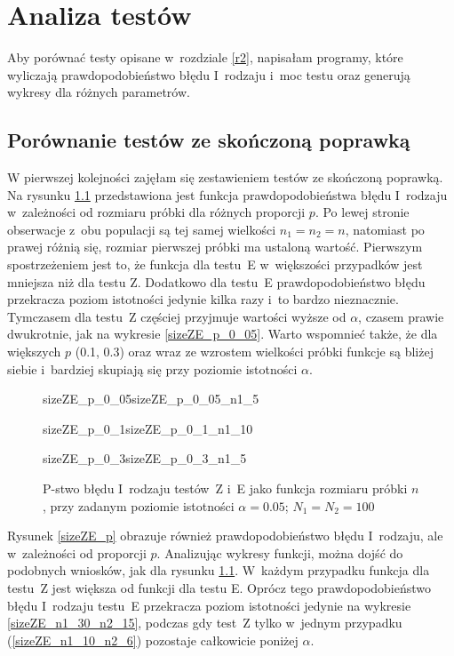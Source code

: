 \chapter{Analiza testów}
\label{r3}

Aby porównać testy opisane w~rozdziale \ref{r2}, napisałam programy, które wyliczają prawdopodobieństwo błędu I~rodzaju i~moc testu oraz generują wykresy dla różnych parametrów.

\section{Porównanie testów ze skończoną poprawką}
W pierwszej kolejności zajęłam się zestawieniem testów ze skończoną poprawką. Na rysunku \ref{sizeZE_n} przedstawiona jest funkcja prawdopodobieństwa błędu I~rodzaju w~zależności od rozmiaru próbki dla różnych proporcji $p$. Po lewej stronie obserwacje z~obu populacji są tej samej wielkości $n_1=n_2=n$, natomiast po prawej różnią się, rozmiar pierwszej próbki ma ustaloną wartość. Pierwszym spostrzeżeniem jest to, że funkcja dla testu~E w~większości przypadków jest mniejsza niż dla testu Z. Dodatkowo dla testu~E prawdopodobieństwo błędu przekracza poziom istotności jedynie kilka razy i~to bardzo nieznacznie. Tymczasem dla testu~Z częściej przyjmuje wartości wyższe od $\alpha$, czasem prawie dwukrotnie, jak na wykresie \ref{sizeZE_p_0_05}. Warto wspomnieć także, że dla większych $p$ (0.1, 0.3) oraz wraz ze wzrostem wielkości próbki funkcje są bliżej siebie i~bardziej skupiają się przy poziomie istotności $\alpha$.

\begin{figure}[!h]
	\begin{subdiagrams}{sizeZE_p_0_05}{sizeZE_p_0_05_n1_5}
	\end{subdiagrams}
	
	\begin{subdiagrams}{sizeZE_p_0_1}{sizeZE_p_0_1_n1_10}
	\end{subdiagrams}
	
	\begin{subdiagrams}{sizeZE_p_0_3}{sizeZE_p_0_3_n1_5}
	\end{subdiagrams}
	\caption{P-stwo błędu I~rodzaju testów~Z i~E jako funkcja rozmiaru próbki $n$, przy zadanym poziomie istotności $\alpha=0.05$; $N_1=N_2=100$}
	\label{sizeZE_n}
\end{figure}

Rysunek \ref{sizeZE_p} obrazuje również prawdopodobieństwo błędu I~rodzaju, ale w~zależności od proporcji $p$. Analizując wykresy funkcji, można dojść do podobnych wniosków, jak dla rysunku \ref{sizeZE_n}. W~każdym przypadku funkcja dla testu~Z jest większa od funkcji dla testu E. Oprócz tego prawdopodobieństwo błędu I~rodzaju testu~E przekracza poziom istotności jedynie na wykresie \ref{sizeZE_n1_30_n2_15}, podczas gdy test~Z tylko w~jednym przypadku (\ref{sizeZE_n1_10_n2_6}) pozostaje całkowicie poniżej $\alpha$.

